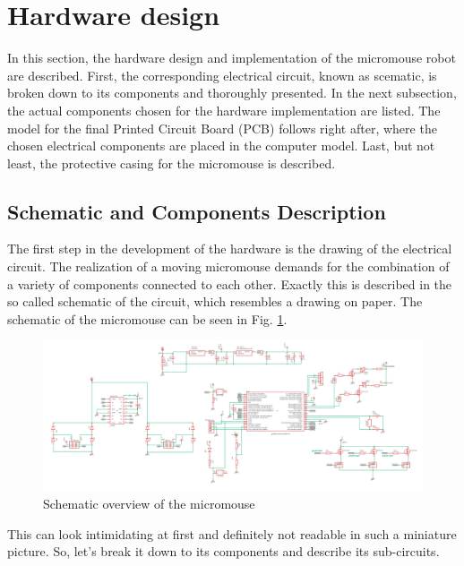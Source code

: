 \section{Hardware design}

In this section, the hardware design and implementation of the micromouse robot are described. First, the corresponding electrical circuit, known as scematic, is broken down to its components and thoroughly presented. In the next subsection, the actual components chosen for the hardware implementation are listed. The model for the final Printed Circuit Board (PCB) follows right after, where the chosen electrical components are placed in the computer model. Last, but not least, the protective casing for the micromouse is described.

\vspace{1cm}

\subsection{Schematic and Components Description}

The first step in the development of the hardware is the drawing of the electrical circuit. The realization of a moving micromouse demands for the combination of a variety of components connected to each other. Exactly this is described in the so called schematic of the circuit, which resembles a drawing on paper. 
The schematic of the micromouse can be seen in Fig. \ref{fig:schematic_overview}.

\begin{figure}[htb]
    \centering
    \includegraphics[width=1\textwidth]{figures/hardware/Schematic.PNG}
    \caption{Schematic overview of the micromouse}
    \label{fig:schematic_overview}
\end{figure}

This can look intimidating at first and definitely not readable in such a miniature picture. So, let's break it down to its components and describe its sub-circuits.

